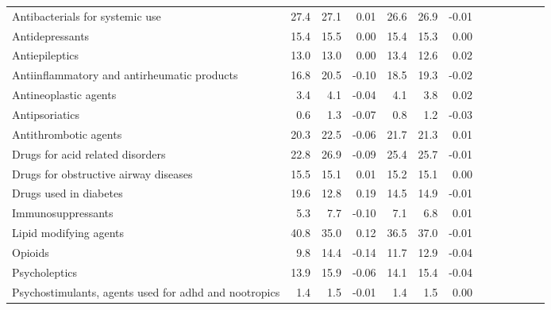 \documentclass[11pt,]{article}
\begin{document}
\begin{longtable}{lrrrrrrrrrrrr}
      Antibacterials for systemic use & 27.4 & 27.1 &  0.01 & 26.6 & 26.9 & -0.01 \\ 
      Antidepressants & 15.4 & 15.5 &  0.00 & 15.4 & 15.3 &  0.00 \\ 
      Antiepileptics & 13.0 & 13.0 &  0.00 & 13.4 & 12.6 &  0.02 \\ 
      Antiinflammatory and antirheumatic products & 16.8 & 20.5 & -0.10 & 18.5 & 19.3 & -0.02 \\ 
      Antineoplastic agents &  3.4 &  4.1 & -0.04 &  4.1 &  3.8 &  0.02 \\ 
      Antipsoriatics &  0.6 &  1.3 & -0.07 &  0.8 &  1.2 & -0.03 \\ 
      Antithrombotic agents & 20.3 & 22.5 & -0.06 & 21.7 & 21.3 &  0.01 \\ 
      Drugs for acid related disorders & 22.8 & 26.9 & -0.09 & 25.4 & 25.7 & -0.01 \\ 
      Drugs for obstructive airway diseases & 15.5 & 15.1 &  0.01 & 15.2 & 15.1 &  0.00 \\ 
      Drugs used in diabetes & 19.6 & 12.8 &  0.19 & 14.5 & 14.9 & -0.01 \\ 
      Immunosuppressants &  5.3 &  7.7 & -0.10 &  7.1 &  6.8 &  0.01 \\ 
      Lipid modifying agents & 40.8 & 35.0 &  0.12 & 36.5 & 37.0 & -0.01 \\ 
      Opioids &  9.8 & 14.4 & -0.14 & 11.7 & 12.9 & -0.04 \\ 
      Psycholeptics & 13.9 & 15.9 & -0.06 & 14.1 & 15.4 & -0.04 \\ 
      Psychostimulants, agents used for adhd and nootropics &  1.4 &  1.5 & -0.01 &  1.4 &  1.5 &  0.00 \\ 
   \bottomrule\end{longtable}
\clearpage
{}
\end{document}
